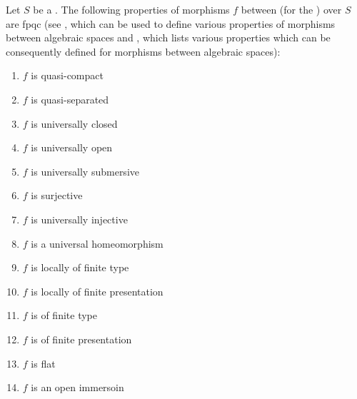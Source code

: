 \begin{proposition} \label{proposition:list_of_propeties_of_morphisms_between_algebraic_spaces_that_are_fpqc_local}
    Let $S$ be a . The following properties of morphisms $f$ between  (for the ) over $S$ are fpqc  (see , which can be used to define various properties of morphisms between algebraic spaces and , which lists various properties which can be consequently defined for morphisms between algebraic spaces):
    \begin{enumerate}
        \item $f$ is quasi-compact
        \item $f$ is quasi-separated
        \item $f$ is universally closed
        \item $f$ is universally open 
        \item $f$ is universally submersive
        \item $f$ is surjective
        \item $f$ is universally injective
        \item $f$ is a universal homeomorphism
        \item $f$ is locally of finite type
        \item $f$ is locally of finite presentation
        \item $f$ is of finite type
        \item $f$ is of finite presentation
        \item $f$ is flat
        \item $f$ is an open immersoin

\end{enumerate}
\end{proposition}
